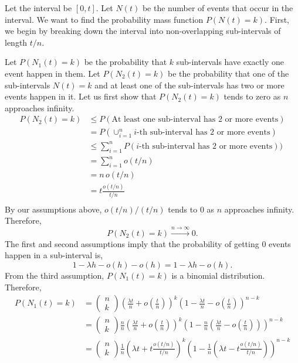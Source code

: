 \documentclass{article}
\begin{document}
Let the interval be $[0, t]$. Let $N(t)$ be the number of events that occur in the interval. We want to find the probability mass function $P(N(t) = k)$. First, we begin by breaking down the interval into non-overlapping sub-intervals of length $t / n$.

Let $P(N_1(t) = k)$ be the probability that $k$ sub-intervals have exactly one event happen in them. Let $P(N_2(t) = k)$ be the probability that one of the sub-intervals $N(t) = k$ and at least one of the sub-intervals has two or more events happen in it. Let us first show that $P(N_2(t) = k)$ tends to zero as $n$ approaches infinity.
\begin{align*}
    P(N_2(t) = k) & \leq P(\text{At least one sub-interval has 2 or more events}) \\
    & = P(\cup_{i=1}^{n} \text{$i$-th sub-interval has 2 or more events}) \\
    & \leq \sum_{i=1}^{n} P(\text{$i$-th sub-interval has 2 or more events})) \\
    & = \sum_{i=1}^{n} o(t / n) \\
    & = n \, o(t / n) \\
    & = t \frac{o(t / n)}{t / n} \\
\end{align*}
By our assumptions above, $o(t / n) / (t / n)$ tends to $0$ as $n$ approaches infinity. Therefore,
\begin{equation*}
    P(N_2(t) = k) \xrightarrow{n \rightarrow{} \infty} 0.
\end{equation*}
The first and second assumptions imply that the probability of getting $0$ events happen in a sub-interval is,
\begin{equation*}
    1 - \lambda h - o(h) - o(h) = 1 - \lambda h - o(h).
\end{equation*}
From the third assumption, $P(N_1(t) = k)$ is a binomial distribution. Therefore,
\begin{align*}
    P(N_1(t) = k) & =
    \begin{pmatrix} n \\ k \end{pmatrix}
    \left( \frac{\lambda t}{n} + o\left( \frac{t}{n} \right) \right) ^ k
    \left( 1 - \frac{\lambda t}{n} - o\left(\frac{t}{n}\right) \right) ^ {n - k} \\
    & =
    \begin{pmatrix} n \\ k \end{pmatrix}
    \frac{n}{n} \left( \frac{\lambda t}{n} + o\left( \frac{t}{n} \right) \right) ^ k
    \left( 1 - \frac{n}{n} (\frac{\lambda t}{n} - o\left(\frac{t}{n}\right))\right) ^ {n - k} \\
    & =
    \begin{pmatrix} n \\ k \end{pmatrix}
    \frac{1}{n} \left( \lambda t + t \frac{o(t / n)}{t / n} \right) ^ k
    \left( 1 - \frac{1}{n} (\lambda t - t\frac{o(t / n)}{t / n} ) \right) ^ {n - k} \\
\end{align*}
\end{document}
